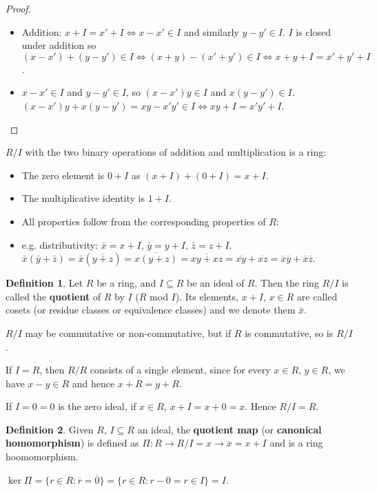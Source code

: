 \documentclass[12pt,a4paper]{article}
\theoremstyle{definition}
\newtheorem{definition}{Definition}[subsection]
\begin{document}
\begin{proof}
	\begin{itemize}
		\item Addition: $x + I = x' + I \Leftrightarrow x - x' \in I$ and similarly $y - y' \in I$. $I$ is closed under addition so $(x - x') + (y - y') \in I \Leftrightarrow (x + y) - (x' + y') \in I \Leftrightarrow x + y + I = x' + y' + I$.
		\item $x - x' \in I$ and $y - y' \in I$, so $(x - x')y \in I$ and $x(y - y') \in I$. $(x - x')y + x(y - y') = xy - x'y' \in I \Leftrightarrow xy + I = x'y' + I$.
	\end{itemize}
\end{proof}

$R / I$ with the two binary operations of addition and multiplication is a ring:
\begin{itemize}
	\item The zero element is $0 + I$ as $(x + I) + (0 + I) = x + I$.
	\item The multiplicative identity is $1 + I$.
	\item All properties follow from the corresponding properties of $R$:
	\item e.g. distributivity: $\bar{x} = x + I$, $\bar{y} = y + I$, $\bar{z} = z + I$.
	$\bar{x}(\bar{y} + \bar{z}) = \bar{x}(\overline{y + z}) = \overline{x(y + z)} = \overline{xy + xz} = \overline{xy} + \overline{xz} = \overline{x}\overline{y} + \overline{x}\overline{z}$.
\end{itemize}

\begin{definition}
	Let $R$ be a ring, and $I \subseteq R$ be an ideal of $R$. Then the ring $R / I$ is called the \textbf{quotient} of $R$ by $I$ ($R$ mod $I$). Its elements, $x + I$, $x \in R$ are called cosets (or residue classes or equivalence classes) and we denote them $\bar{x}$.
	
	$R / I$ may be commutative or non-commutative, but if $R$ is commutative, so is $R / I$.

	If $I = R$, then $R / R$ consists of a single element, since for every $x \in R$, $y \in R$, we have $x - y \in R$ and hence $x + R = y + R$.

	If $I = 0 = {0}$ is the zero ideal, if $x \in R$, $x + I = x + 0 = x$. Hence $R / I = R$.
\end{definition}

\begin{definition}
	Given $R$, $I \subseteq R$ an ideal, the \textbf{quotient map} (or \textbf{canonical homomorphism}) is defined as $\Pi: R \rightarrow R / I = x \rightarrow \overline{x} = x + I$ and is a ring hoomomorphism.

	$\ker \Pi = \{r \in R: \overline{r} = \overline{0}\} = \{r \in R: r - 0 = r \in I\} = I$.
\end{definition}
\end{document}
